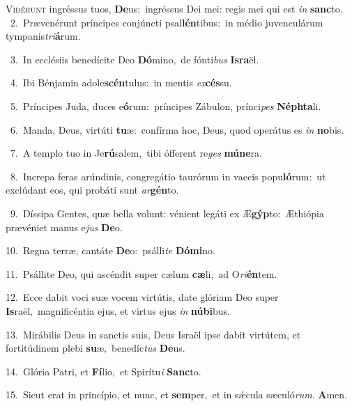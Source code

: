 \lettrine{\initial\textcolor{\initialcolor}{V}}{idérunt} ingréssus tuos, \textbf{De}\-us:~\star ingréssus Dei mei: regis mei qui est \textit{in} \textbf{sanc}\-to.\\
{\numbfont\textcolor{\numbcolor}{~2.}}~Prævenérunt príncipes conjúncti psal\-\textbf{lén}\-tibus:~\star in médio juvenculárum tympanis\-\textit{tri}\-\textbf{á}rum.\par
{\numbfont\textcolor{\numbcolor}{~3.}}~In ecclésiis benedícite Deo \textbf{Dó}\-mino,~\star de fónti\textit{bus} \textbf{Is}\-\textbf{ra}ël.\par
{\numbfont\textcolor{\numbcolor}{~4.}}~Ibi Bénjamin adole\-\textbf{scén}\-tulus:~\star in mentis \textit{ex}\-\textbf{cés}su.\par
{\numbfont\textcolor{\numbcolor}{~5.}}~Príncipes Juda, duces e\-\textbf{ó}\-rum:~\star príncipes Zábulon, prínci\textit{pes} \textbf{Néph}\-\textbf{ta}li.\par
{\numbfont\textcolor{\numbcolor}{~6.}}~Manda, Deus, virtúti \textbf{tu}\-æ:~\star confírma hoc, Deus, quod operátus es \textit{in} \textbf{no}\-bis.\par
{\numbfont\textcolor{\numbcolor}{~7.}}~A templo tuo in Je\-\textbf{rú}\-salem,~\star tibi ófferent re\textit{ges} \textbf{mú}\-\textbf{ne}ra.\par
{\numbfont\textcolor{\numbcolor}{~8.}}~Increpa feras arúndinis, congregátio taurórum in vaccis popu\-\textbf{ló}\-rum:~\star ut exclúdant eos, qui probáti sunt \textit{ar}\-\textbf{gén}to.\par
{\numbfont\textcolor{\numbcolor}{~9.}}~Díssipa Gentes, quæ bella volunt: vénient legáti ex Æ\-\textbf{gýp}\-to:~\star Æthiópia prævéniet manus e\textit{jus} \textbf{De}\-o.\par
{\numbfont\textcolor{\numbcolor}{10.}}~Regna terræ, cantáte \textbf{De}\-o:~\star psálli\textit{te} \textbf{Dó}\-\textbf{mi}no.\par
{\numbfont\textcolor{\numbcolor}{11.}}~Psállite Deo, qui ascéndit super cælum \textbf{cæ}\-li,~\star ad O\-\textit{ri}\-\textbf{én}tem.\par
{\numbfont\textcolor{\numbcolor}{12.}}~Ecce dabit voci suæ vocem virtútis, date glóriam Deo super \textbf{Is}\-raël,~\star magnificéntia ejus, et virtus ejus \textit{in} \textbf{nú}\-\textbf{bi}bus.\par
{\numbfont\textcolor{\numbcolor}{13.}}~Mirábilis Deus in sanctis suis, Deus Israël ipse dabit virtútem, et fortitúdinem plebi \textbf{su}\-æ,~\star benedíc\textit{tus} \textbf{De}\-us.\par
{\numbfont\textcolor{\numbcolor}{14.}}~Glória Patri, et \textbf{Fí}\-lio,~\star et Spirítu\textit{i} \textbf{Sanc}\-to.\par
{\numbfont\textcolor{\numbcolor}{15.}}~Sicut erat in princípio, et nunc, et \textbf{sem}\-per,~\star et in sǽcula sæculó\-\textit{rum}\-. \textbf{A}\-men.\par
